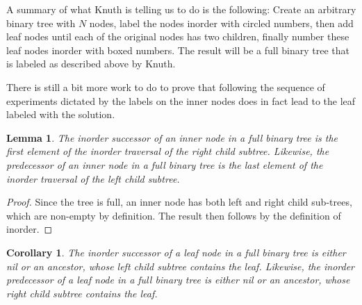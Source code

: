 \documentclass[12pt]{amsart}
\newtheorem{corollary}[theorem]{Corollary}
\newtheorem{lemma}[theorem]{Lemma}
\theoremstyle{definition}
\theoremstyle{theorem}
\begin{document}
A summary of what Knuth is telling us to do is the following: 
Create an arbitrary binary tree with $N$ nodes,
label the nodes inorder with circled numbers, then add leaf nodes until each of the original nodes has two children, 
finally number these leaf nodes inorder with boxed numbers. 
The result will be a full binary tree that is labeled as described above by Knuth.


There is still a bit more work to do to
prove that following the sequence of experiments dictated by the labels on the inner nodes
does in fact lead to the leaf labeled with the solution.


\begin{lemma} \label{lemma.successor}
	The inorder successor of an inner node in a full binary tree is the first element of the inorder traversal of the right child subtree. Likewise, the predecessor of an inner node in a full binary tree is the last element of the inorder traversal of the left child subtree.
\end{lemma}

\begin{proof}
	Since the tree is full, an inner node has both left and right child sub-trees, which are non-empty by definition. The result then follows by the definition of inorder.
	\end{proof}

\begin{corollary}\label{corollary.ancestor}
	The inorder successor of a leaf node in a full binary tree is either nil or an ancestor, whose left child subtree contains the leaf. 
	Likewise, the inorder predecessor of a leaf node in a full binary tree is either nil or an ancestor, whose right child subtree contains the leaf.
\end{corollary}
\end{document}

